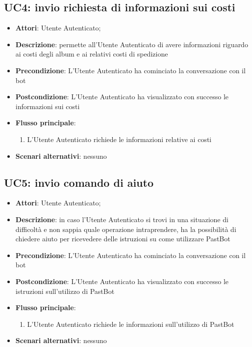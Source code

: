 


\subsection{UC4: invio richiesta di informazioni sui costi}
\label{uc:uc4}

\begin{itemize}
  \item \textbf{Attori}: Utente Autenticato;
  \item \textbf{Descrizione}: permette all'Utente Autenticato di avere
informazioni riguardo ai costi degli album e ai relativi costi di spedizione
  \item \textbf{Precondizione}: L'Utente Autenticato ha cominciato la
conversazione con il bot
  \item \textbf{Postcondizione}: L'Utente Autenticato ha visualizzato con
successo le informazioni sui costi
  \item \textbf{Flusso principale}:
  \begin{enumerate}
    \item L'Utente Autenticato richiede le informazioni relative ai costi
  \end{enumerate}
  \item \textbf{Scenari alternativi}: nessuno
\end{itemize}



\subsection{UC5: invio comando di aiuto}
\label{uc:uc5}

\begin{itemize}
  \item \textbf{Attori}: Utente Autenticato;
  \item \textbf{Descrizione}: in caso l'Utente Autenticato si trovi in una
situazione di difficoltà e non sappia quale operazione intraprendere, ha la
possibilità di chiedere aiuto per ricevedere delle istruzioni su come
utilizzare PastBot
  \item \textbf{Precondizione}: L'Utente Autenticato ha cominciato la
conversazione con il bot
  \item \textbf{Postcondizione}: L'Utente Autenticato ha visualizzato con
successo le istruzioni sull'utilizzo di PastBot
  \item \textbf{Flusso principale}:
  \begin{enumerate}
    \item L'Utente Autenticato richiede le informazioni sull'utilizzo di
PastBot
  \end{enumerate}
  \item \textbf{Scenari alternativi}: nessuno
\end{itemize}



